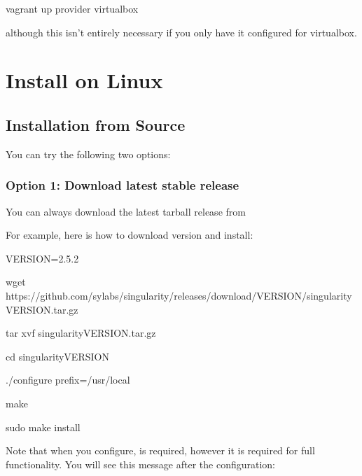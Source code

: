 \documentclass[letterpaper,10pt,english]{sphinxmanual}
\begin{document}
%
\begin{sphinxVerbatim}[commandchars=\\\{\}]
vagrant up \PYGZhy{}\PYGZhy{}provider virtualbox
\end{sphinxVerbatim}

although this isn’t entirely necessary if you only have it configured for virtualbox.


\section{Install on Linux}
\label{\detokenize{installation:install-on-linux}}

\subsection{Installation from Source}
\label{\detokenize{installation:installation-from-source}}
You can try the following two options:


\subsubsection{Option 1: Download latest stable release}
\label{\detokenize{installation:option-1-download-latest-stable-release}}
You can always download the latest tarball release from 

For example, here is how to download version  and install:

%
\begin{sphinxVerbatim}[commandchars=\\\{\}]
VERSION=2.5.2

wget https://github.com/sylabs/singularity/releases/download/\PYGZdl{}VERSION/singularity\PYGZhy{}\PYGZdl{}VERSION.tar.gz

tar xvf singularity\PYGZhy{}\PYGZdl{}VERSION.tar.gz

cd singularity\PYGZhy{}\PYGZdl{}VERSION

./configure \PYGZhy{}\PYGZhy{}prefix=/usr/local

make

sudo make install
\end{sphinxVerbatim}

Note that when you configure,  is  required, however it is required for full functionality. You will see this message after the configuration:
\end{document}
